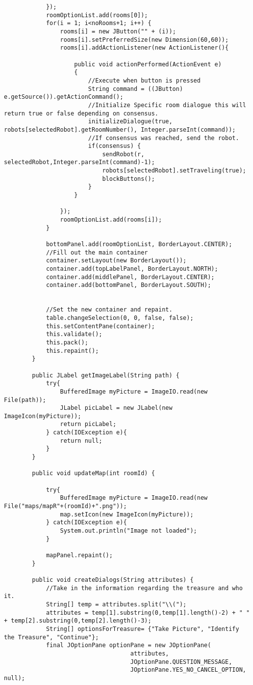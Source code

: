 \begin{lstlisting}
			});
			roomOptionList.add(rooms[0]);
			for(i = 1; i<noRooms+1; i++) {
				rooms[i] = new JButton("" + (i));
				rooms[i].setPreferredSize(new Dimension(60,60));
				rooms[i].addActionListener(new ActionListener(){

					public void actionPerformed(ActionEvent e)
	            	{
		                //Execute when button is pressed
		                String command = ((JButton) e.getSource()).getActionCommand();
		            	//Initialize Specific room dialogue this will return true or false depending on consensus.
		            	initializeDialogue(true, robots[selectedRobot].getRoomNumber(), Integer.parseInt(command));
		            	//If consensus was reached, send the robot.
		            	if(consensus) {
		            		sendRobot(r, selectedRobot,Integer.parseInt(command)-1);
		            		robots[selectedRobot].setTraveling(true);
		            		blockButtons();
		            	}
	            	}

				});
				roomOptionList.add(rooms[i]);
			}

			bottomPanel.add(roomOptionList, BorderLayout.CENTER);
			//Fill out the main container
			container.setLayout(new BorderLayout());
			container.add(topLabelPanel, BorderLayout.NORTH);
			container.add(middlePanel, BorderLayout.CENTER);
			container.add(bottomPanel, BorderLayout.SOUTH);


			//Set the new container and repaint.
			table.changeSelection(0, 0, false, false);
			this.setContentPane(container);
			this.validate();
			this.pack();
			this.repaint();
		}

		public JLabel getImageLabel(String path) {
			try{ 
				BufferedImage myPicture = ImageIO.read(new File(path));
				JLabel picLabel = new JLabel(new ImageIcon(myPicture));
				return picLabel;
			} catch(IOException e){
				return null;
			}
		}

		public void updateMap(int roomId) {
			
			try{ 
				BufferedImage myPicture = ImageIO.read(new File("maps/mapR"+(roomId)+".png"));
				map.setIcon(new ImageIcon(myPicture));
			} catch(IOException e){
				System.out.println("Image not loaded");
			}

			mapPanel.repaint();
		}

		public void createDialogs(String attributes) {
			//Take in the information regarding the treasure and who it.
			String[] temp = attributes.split("\\(");
			attributes = temp[1].substring(0,temp[1].length()-2) + " " + temp[2].substring(0,temp[2].length()-3);
			String[] optionsForTreasure= {"Take Picture", "Identify the Treasure", "Continue"};
			final JOptionPane optionPane = new JOptionPane(
                                    attributes,
                                    JOptionPane.QUESTION_MESSAGE,
                                    JOptionPane.YES_NO_CANCEL_OPTION, null);


\end{lstlisting}
